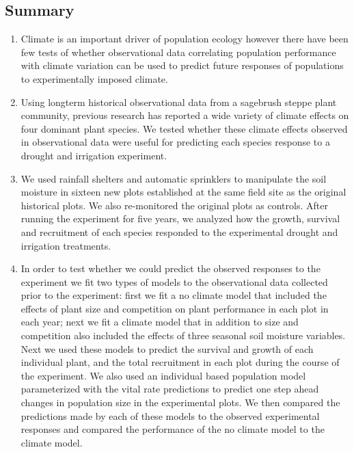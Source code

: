 \documentclass[11pt]{article}
\begin{document}
\begin{doublespacing} 

\linenumbers

\section*{Summary}

\begin{enumerate}
\item Climate is an important driver of population ecology however there have been few tests of whether observational data correlating population performance with climate variation can be used to predict future responses of populations to experimentally imposed climate.   
\item Using longterm historical observational data from a sagebrush steppe plant community, previous research has reported a wide variety of climate effects on four dominant plant species. We tested whether these climate effects observed in observational data were useful for predicting each species response to a drought and irrigation experiment. 
\item We used rainfall shelters and automatic sprinklers to manipulate the soil moisture in sixteen new plots established at the same field site as the original historical plots. We also re-monitored the original plots as controls. After running the experiment for five years, we analyzed how the growth, survival and recruitment of each species responded to the experimental drought and irrigation treatments.   
\item In order to test whether we could predict the observed responses to the experiment we fit two types of models to the observational data collected prior to the experiment: first we fit a no climate model that included the effects of plant size and competition on plant performance in each plot in each year; next we fit a climate model that in addition to size and competition also included the effects of three seasonal soil moisture variables. Next we used these models to predict the survival and growth of each individual plant, and the total recruitment in each plot during the course of the experiment. We also used an individual based population model parameterized with the vital rate predictions to predict one step ahead changes in population size in the experimental plots. We then compared the predictions made by each of these models to the observed experimental responses and compared the performance of the no climate model to the climate model.   

\end{enumerate}
\end{doublespacing}
\end{document}
